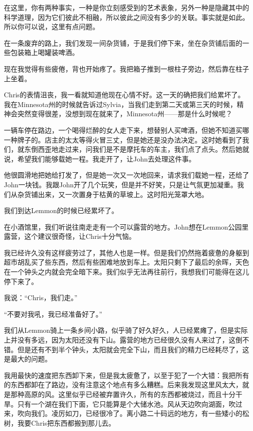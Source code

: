\documentclass[UTF8]{article}
\begin{document}
\par 在这里，你有两种事实，一种是你立刻感受到的艺术表象，另外一种是隐藏其中的科学道理，因为它们彼此不相融，所以彼此之间没有多少的关联。事实就是如此。所以你可以说，这里有点问题。
\par 在一条废弃的路上，我们发现一间杂货铺，于是我们停下来，坐在杂货铺后面的一些包装箱上喝罐装啤酒。
\par 现在我觉得有些疲倦，背也开始疼了。我把箱子推到一根柱子旁边，然后靠在柱子上坐着。
\par Chris的表情沮丧，我一看就知道他现在心情不好。这一天的确把我们给累坏了。我在Minnesota州的时候就告诉过Sylvia，当我们走到第二天或第三天的时候，精神会突然变得很差，没想到现在就来了，Minnesota州——那是什么时候呢？
\par 一辆车停在路边，一个喝得烂醉的女人走下来，想替别人买啤酒，但她不知道买哪一种牌子的。店主的太太等得火冒三丈，但是她还是没办法决定。这时她看到了我们，就东倒西歪地走过来，问我们是不是摩托车的车主，我们点了点头。然后她就说，希望我们能够载她一程。我走开了，让John去处理这件事。
\par 他很圆滑地把她给打发了，但是她一次又一次地回来，请求我们载她一程，还给了John一块钱。我跟John开了几个玩笑，但是并不好笑，只是让气氛更加凝重。我们从杂货铺出来，又一次置身于枯黄的草坡上。这时阳光笼罩大地。
\par 我们到达Lemmon的时候已经累坏了。
\par 在小酒馆里，我们听说往南走走有一个可以露营的地方。John想在Lemmon公园里露营，这个建议很奇怪，让Chris十分气恼。
\par 我已经许久没有这样疲劳过了，其他人也是一样。但是我们仍然拖着疲惫的身躯到超市胡乱买了些东西，然后有些困难地放到车上。太阳只剩下了最后的余晖，天色在一个钟头之内就会完全暗下来。我们似乎无法再往前行，我想我们可能得在这儿停下来了。
\par 我说：“Chris，我们走。”
\par “不要对我吼，我已经准备好了。”
\par 我们从Lemmon骑上一条乡间小路，似乎骑了好久好久，人已经累瘫了，但是实际上并没有多远，因为太阳还没有下山。露营的地方已经很久没有人来过了，这倒不错。但是还有不到半个钟头，太阳就会完全下山，而且我们的精力已经耗尽了，这是最大的问题。
\par 我用最快的速度把东西卸下来，但是我太疲惫了，以至于犯了一个大错：我把所有的东西都卸在了路边，没有注意这个地点有多么糟糕。后来我发现这里风太大，就是那种高原的风。这里似乎已经被弃置许久，所有的东西都被烧过，而且十分干旱。只有一个湖在我们下面，它只能算是个大储水池。风从天边吹向湖面，吹过来，吹向我们。凌厉如刀，已经很冷了。离小路二十码远的地方，有一些矮小的松树，我要Chris把东西都搬到那儿去。
\end{document}
